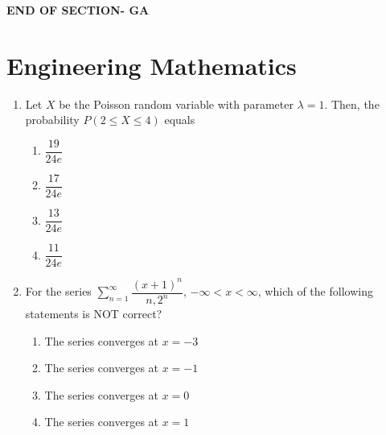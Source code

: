 \documentclass[journal,12pt,onecolumn]{IEEEtran}
\begin{document}
\vspace{3\baselineskip}
\begin{center}
    \item[\textbf{END OF SECTION- GA}]
\end{center}






\newpage
\section*{Engineering Mathematics}
\noindent
\vspace{1cm}

\begin{enumerate}[label=\arabic*)]
\item Let $X$ be the Poisson random variable with parameter $\lambda=1$. Then, the probability $P(2 \le X \le 4)$ equals
\hfill{} \\

\vspace{0.2cm}
\begin{enumerate}[label=\alph*)]
\item $\dfrac{19}{24e}$
\vspace{0.1cm}
\item $\dfrac{17}{24e}$
\vspace{0.1cm}
\item $\dfrac{13}{24e}$
\vspace{0.1cm}
\item $\dfrac{11}{24e}$
\end{enumerate}

\vspace{0.5cm}

\item For the series $\sum_{n=1}^{\infty}\dfrac{(x+1)^n}{n,2^n}$, $-\infty<x<\infty$, which of the following statements is NOT correct?
\vspace{0.1cm}
\hfill{} \\

\begin{enumerate}[label=\alph*)]
\item The series converges at $x=-3$
\item The series converges at $x=-1$
\item The series converges at $x=0$
\item The series converges at $x=1$
\end{enumerate}


\end{enumerate}
\end{document}
